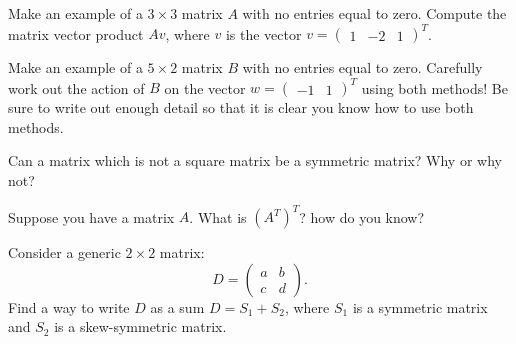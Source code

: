 \documentclass[elementsmain.tex]{subfiles}
\begin{document}
\begin{exercise} Make an example of a $3\times 3$ matrix $A$ with no entries equal to zero.
Compute the matrix vector product $Av$, where $v$ is the vector $v = \begin{pmatrix} 1 & -2 & 1 \end{pmatrix}^T$. 
\end{exercise}

\begin{exercise} Make an example of a $5\times 2$ matrix $B$ with no entries equal to zero. Carefully work out the action of $B$ on the vector $w = \begin{pmatrix} -1 & 1 \end{pmatrix}^T$ using both methods! Be sure to write out enough detail so that it is clear you know how to use both methods.
\end{exercise}

\begin{exercise} Can a matrix which is not a square matrix be a symmetric matrix? Why or why not?

Suppose you have a matrix $A$. What is $(A^T)^T$? how do you know?
\end{exercise}

\begin{challenge}
Consider a generic $2\times 2$ matrix:
\[
D = \begin{pmatrix} a & b \\ c & d \end{pmatrix}.
\]
Find a way to write $D$ as a sum $D = S_1 + S_2$, where $S_1$ is a symmetric matrix and $S_2$ is a skew-symmetric matrix.

\end{challenge}

\clearpage
\end{document}
